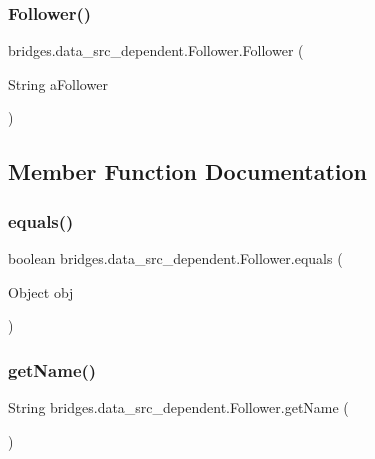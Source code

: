 \subsubsection{\texorpdfstring{Follower()}{Follower()}}
{\footnotesize\ttfamily bridges.\+data\+\_\+src\+\_\+dependent.\+Follower.\+Follower (\begin{DoxyParamCaption}\item[{String}]{a\+Follower }\end{DoxyParamCaption})}



\subsection{Member Function Documentation}
\mbox{\label{classbridges_1_1data__src__dependent_1_1_follower_af98127e42a1adb6a64aae684544e571b}} 
\subsubsection{\texorpdfstring{equals()}{equals()}}
{\footnotesize\ttfamily boolean bridges.\+data\+\_\+src\+\_\+dependent.\+Follower.\+equals (\begin{DoxyParamCaption}\item[{Object}]{obj }\end{DoxyParamCaption})}

\mbox{\label{classbridges_1_1data__src__dependent_1_1_follower_a38620293ea907fbb2b2fca65a72f953f}} 
\subsubsection{\texorpdfstring{getName()}{getName()}}
{\footnotesize\ttfamily String bridges.\+data\+\_\+src\+\_\+dependent.\+Follower.\+get\+Name (\begin{DoxyParamCaption}{ }\end{DoxyParamCaption})}

